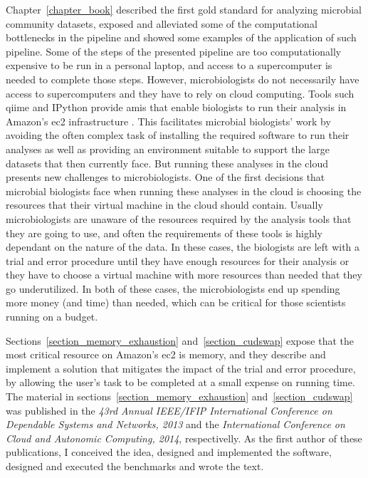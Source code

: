 \documentclass[12pt,chapterheads]{ucsd}
\begin{document}
Chapter~\ref{chapter_book} described the first gold standard for analyzing microbial
community datasets, exposed and alleviated some of the computational bottlenecks in the
pipeline and showed some examples of the application of such pipeline. Some of the
steps of the presented pipeline are too computationally expensive to be run in a
personal laptop, and access to a supercomputer is needed to complete those steps.
However, microbiologists do not necessarily have access to supercomputers and they have
to rely on cloud computing. Tools such \gls{qiime} \cite{Caporaso2010} and IPython
\cite{Perez2007} provide \gls{ami}s that enable biologists to run their analysis in
Amazon's \gls{ec2} infrastructure \cite{RaganKelley2013}. This facilitates microbial
biologists' work by avoiding the often complex task of installing the required software to run
their analyses as well as providing an environment suitable to support the large
datasets that then currently face. But running these analyses in the cloud presents
new challenges to microbiologists. One of the first decisions that microbial
biologists face when running these analyses in the cloud is choosing the resources
that their virtual machine in the cloud should contain. Usually microbiologists
are unaware of the resources required by the analysis tools that they are going to
use, and often the requirements of these tools is highly dependant on the nature
of the data. In these cases, the biologists are left with a trial and error procedure
until they have enough resources for their analysis or they have to choose a virtual
machine with more resources than needed that they go underutilized. In both of these
cases, the microbiologists end up spending more money (and time) than
needed, which can be critical for those scientists running on a budget.

Sections~\ref{section_memory_exhaustion} and~\ref{section_cudswap} expose that
the most critical resource on Amazon's \gls{ec2} is memory, and they describe and
implement a solution that mitigates the impact of the trial and error procedure, by
allowing the user's task to be completed at a small expense on running time. The material
in sections~\ref{section_memory_exhaustion} and~\ref{section_cudswap} was published
in the \textsl{43rd Annual IEEE/IFIP International Conference on Dependable Systems
and Networks, 2013} and the \textsl{International Conference on Cloud and Autonomic
Computing, 2014}, respectivelly. As the first author of these publications, I
conceived the idea, designed and implemented the software, designed and executed
the benchmarks and wrote the text.
\end{document}
